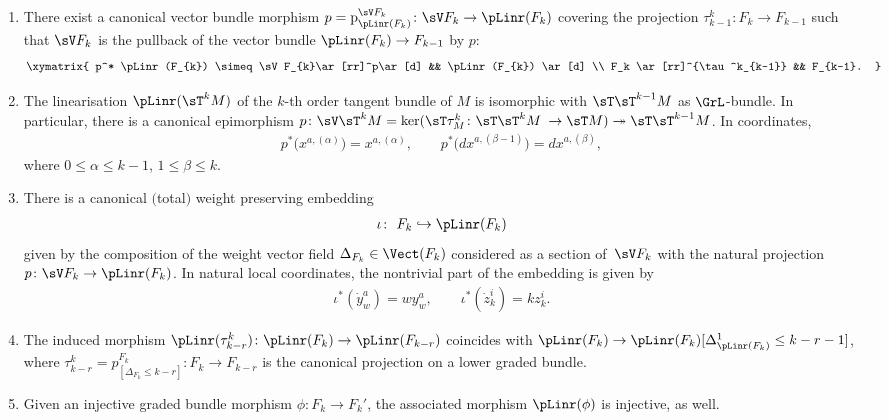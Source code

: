 \begin{Proposition}\label{prop:pLin}\quad
\begin{enumerate}[$(a)$]\itemsep=0pt
\item \label{prop_pL:item_pullback} There exist a canonical vector bundle morphism $p=\textnormal{p}^{\sV F_{k}}_{\pLinr(F_{k})} \colon \sV F_{k} \rightarrow \pLinr(F_{k})$ covering the projection $\tau^k_{k-1}\colon F_k\rightarrow F_{k-1}$ such that $\sV F_{k}$ is the pullback of the vector bundle $\pLinr(F_{k})\rightarrow F_{k-1}$ by $p$:
 \begin{gather*}
\xymatrix{
p^* \pLinr(F_{k}) \simeq \sV F_{k}\ar[rr]^p\ar[d] && \pLinr(F_{k}) \ar[d] \\
F_k \ar[rr]^{\tau^k_{k-1}} && F_{k-1}.
}
\end{gather*}
\item \label{prop_pL:itemTkM} The linearisation $\pLinr(\sT^k M)$ of the $k$-th order tangent bundle of $M$ is isomorphic with $\sT \sT^{k-1} M$ as $\GrL$-bundle. In particular, there is a canonical epimorphism $ p\colon \sV \sT^k M = \ker (\sT \tau^k_M\colon \sT\sT^k M $ $\rightarrow \sT M) \twoheadrightarrow \sT\sT^{k-1} M$. In coordinates,
 \begin{gather*}
 p^*\big(x^{a, (\alpha)}\big) = x^{a, (\alpha)}, \qquad p^*\big(dx^{a, (\beta-1)}\big) = dx^{a, (\beta)},
 \end{gather*}
 where $0\leq \alpha\leq k-1$, $1\leq \beta \leq k$.
\item \label{prop_pL:item embedding} There is a canonical $($total$)$ weight preserving embedding
\begin{gather*}
\iota \colon \ F_{k} \hookrightarrow \pLinr(F_{k})
\end{gather*}
given by the composition of the weight vector field $\Delta_{F_k} \in \Vect(F_k)$ considered as a section of~$\sV F_{k}$ with the natural projection $p\colon \sV F_{k} \rightarrow \pLinr(F_{k})$. In natural local coordinates, the nontrivial part of the embedding is given by
\begin{gather*}
\iota^{*}(\dot{y}^{a}_{w}) = w   y^{a}_{w}, \qquad \iota^{*}(\dot{z}_{k}^{i}) = k  z_{k}^{i}.
\end{gather*}
\item \label{prop_pL:item_pl_tau} The induced morphism $\pLinr(\tau^k_{k-r})\colon \pLinr(F_k)\rightarrow \pLinr(F_{k-r})$ coincides with $\pLinr(F_k) \rightarrow \pLinr(F_k)[\Delta^1_{\pLinr(F_{k})} \leq k-r-1]$, where $\tau^k_{k-r} = p^{F_k}_{[\Delta_{F_k}\leq k-r]}\colon  F_k\to F_{k-r}$ is the canonical projection on a lower graded bundle.
\item \label{prop_pL:item_injective} Given an injective graded bundle morphism $\phi\colon F_k\rightarrow F_k'$, the associated morphism $\pLinr(\phi)$ is injective, as well.
\end{enumerate}
\end{Proposition}

